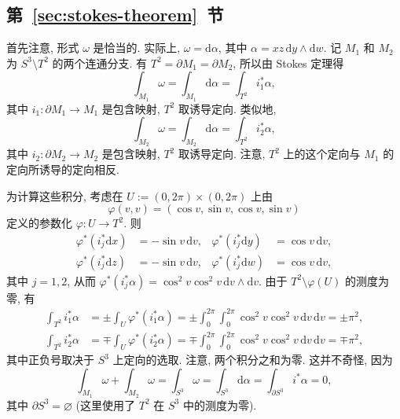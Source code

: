 \subsection{\texorpdfstring{第~\ref{sec:stokes-theorem}~节}{Stokes 定理}}\label{subsec:solutions-stokes-theorem}

\begin{description}[font=\normalfont,leftmargin=2em,labelwidth=1.5em]
首先注意, 形式 $\omega$ 是恰当的. 实际上, $\omega=\mathrm{d}\alpha$, 其中 $\alpha=xz\,\mathrm{d}y\wedge\mathrm{d}w$. 记 $M_1$ 和 $M_2$ 为 $S^3\setminus T^2$ 的两个连通分支. 有 $T^2=\partial M_1=\partial M_2$, 所以由 Stokes 定理得
\[
  \int_{M_1}\omega=\int_{M_1}\mathrm{d}\alpha=\int_{T^2} i_1^*\alpha,
\]
其中 $i_1:\partial M_1\to M_1$ 是包含映射, $T^2$ 取诱导定向. 类似地,
\[
  \int_{M_2}\omega=\int_{M_2}\mathrm{d}\alpha=\int_{T^2} i_2^*\alpha,
\]
其中 $i_2:\partial M_2\to M_2$ 是包含映射, $T^2$ 取诱导定向. 注意, $T^2$ 上的这个定向与 $M_1$ 的定向所诱导的定向相反.

为计算这些积分, 考虑在 $U:=(0,2\pi)\times(0,2\pi)$ 上由
\[
  \varphi(v,v)=(\cos v,\sin v,\cos v,\sin v)
\]
定义的参数化 $\varphi:U\to T^2$. 则
\begin{align*}
  \varphi^*(i_j^*\mathrm{d}x)&=-\sin v\,\mathrm{d}v,&
  \varphi^*(i_j^*\mathrm{d}y)&=\cos v\,\mathrm{d}v,\\
  \varphi^*(i_j^*\mathrm{d}z)&=-\sin v\,\mathrm{d}v,&
  \varphi^*(i_j^*\mathrm{d}w)&=\cos v\,\mathrm{d}v,
\end{align*}
其中 $j=1,2$, 从而 $\varphi^*(i_j^*\alpha)=\cos^2v\cos^2v\,\mathrm{d}v\wedge\mathrm{d}v$. 由于 $T^2\setminus\varphi(U)$ 的测度为零, 有
\begin{align*}
  \int_{T^2}i_1^*\alpha&=\pm\int_U\varphi^*(i_1^*\alpha)
   =\pm\int_0^{2\pi}\int_0^{2\pi}\cos^2v\cos^2v\,\mathrm{d}v\,\mathrm{d}v=\pm\pi^2,\\
  \int_{T^2}i_2^*\alpha&=\mp\int_U\varphi^*(i_2^*\alpha)
   =\mp\int_0^{2\pi}\int_0^{2\pi}\cos^2v\cos^2v\,\mathrm{d}v\,\mathrm{d}v=\mp\pi^2,
\end{align*}
其中正负号取决于 $S^3$ 上定向的选取. 注意, 两个积分之和为零. 这并不奇怪, 因为
\[
  \int_{M_1}\omega+\int_{M_2}\omega=\int_{S^3}\omega
  =\int_{S^3}\mathrm{d}\alpha=\int_{\partial S^3}i^*\alpha=0,
\]
其中 $\partial S^3=\varnothing$ (这里使用了 $T^2$ 在 $S^3$ 中的测度为零).


\end{description}
